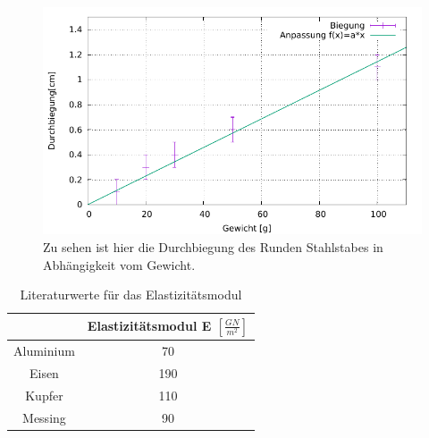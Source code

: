 \begin{figure}[h]
	\centering
	\includegraphics[width=1\textwidth]{res/DurchbiegungStahl.pdf}
	\caption{Zu sehen ist hier die Durchbiegung des Runden Stahlstabes in Abhängigkeit vom Gewicht.}
	\label{fig:durchbiegungStahl}
\end{figure}
\begin{table}[h]
	\caption{Literaturwerte für das Elastizitätsmodul}
	\begin{tabular}{|c|c|}
		\hline
		& Elastizitätsmodul E $\left[\frac{GN}{m^2}\right]$\\
		\hline
		Aluminium & 70 \\
		\hline
		Eisen & 190 \\
		\hline
		Kupfer & 110 \\
		\hline
		Messing & 90 \\
		\hline
	\end{tabular}
\label{tab:ElaLit}
\end{table}